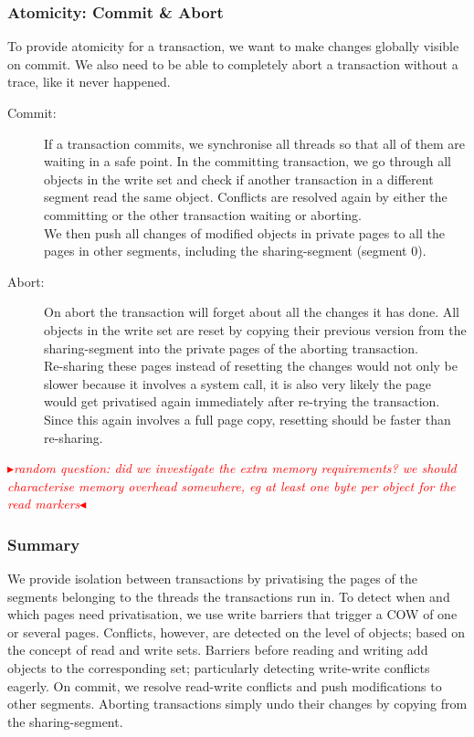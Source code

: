 \documentclass{sigplanconf}
\newcommand{\mynote}[2]{%
  \textcolor{red}{%
    \fbox{\bfseries\sffamily\scriptsize#1}%
    {\small$\blacktriangleright$\textsf{\emph{#2}}$\blacktriangleleft$}%
  }%
}
\newcommand\cfbolz[1]{\mynote{cfbolz}{#1}}
\begin{document}
\subsubsection{Atomicity: Commit \& Abort}

To provide atomicity for a transaction, we want to make changes globally
visible on commit. We also need to be able to completely abort a
transaction without a trace, like it never happened.
\begin{description}
\item [{Commit:}] If a transaction commits, we synchronise all threads
  so that all of them are waiting in a safe point. In the committing
  transaction, we go through all objects in the write set and check if
  another transaction in a different segment read the same object.
  Conflicts are resolved again by either the committing or the other
  transaction waiting or aborting.\\
  We then push all changes of modified objects in private pages to all
  the pages in other segments, including the sharing-segment (segment
  0).
\item [{Abort:}] On abort the transaction will forget about all the
  changes it has done. All objects in the write set are reset by
  copying their previous version from the sharing-segment into the
  private pages of the aborting transaction.\\
  Re-sharing these pages instead of resetting the changes would not
  only be slower because it involves a system call, it is also very
  likely the page would get privatised again immediately after re-trying
  the transaction.  Since this again involves a full page copy,
  resetting should be faster than re-sharing.
\end{description}

\cfbolz{random question: did we investigate the extra memory requirements? we should characterise memory overhead somewhere, eg at least one byte per object for the read markers}

\subsubsection{Summary}

We provide isolation between transactions by privatising the pages of
the segments belonging to the threads the transactions run in.  To
detect when and which pages need privatisation, we use write barriers
that trigger a COW of one or several pages. Conflicts, however, are
detected on the level of objects; based on the concept of read and
write sets. Barriers before reading and writing add objects to the
corresponding set; particularly detecting write-write conflicts
eagerly.  On commit, we resolve read-write conflicts and push
modifications to other segments. Aborting transactions simply undo
their changes by copying from the sharing-segment.
\end{document}
